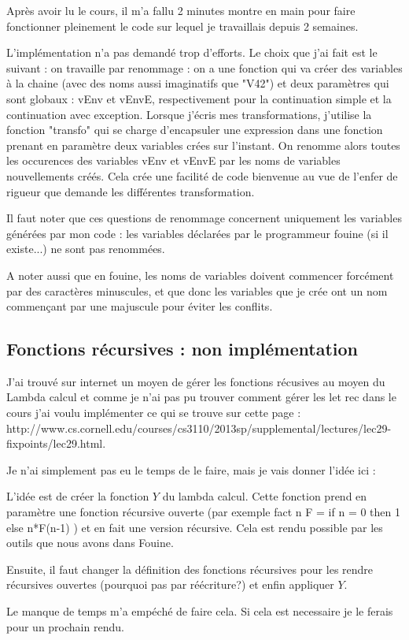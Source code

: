\documentclass[a4paper,10pt]{report}
\begin{document}
Après avoir lu le cours, il m'a fallu 2 minutes montre en main pour faire fonctionner pleinement le code sur lequel je travaillais depuis 2 semaines.

L'implémentation n'a pas demandé trop d'efforts. Le choix que j'ai fait est le suivant : on travaille par renommage : on a une fonction qui va créer des variables à la chaine (avec des noms aussi imaginatifs que "V42") et deux paramètres qui sont globaux : vEnv et vEnvE, respectivement pour la continuation simple et la continuation avec exception. Lorsque j'écris mes transformations, j'utilise la fonction "transfo" qui se charge d'encapsuler une expression dans une fonction prenant en paramètre deux variables crées sur l'instant. On renomme alors toutes les occurences des variables vEnv et vEnvE par les noms de variables nouvellements créés. Cela crée une facilité de code bienvenue au vue de l'enfer de rigueur que demande les différentes transformation.

Il faut noter que ces questions de renommage concernent uniquement les variables générées par mon code : les variables déclarées par le programmeur fouine (si il existe...) ne sont pas renommées.

A noter aussi que en fouine, les noms de variables doivent commencer forcément par des caractères minuscules, et que donc les variables que je crée ont un nom commençant par une majuscule pour éviter les conflits.

\subsection{Fonctions récursives : non implémentation}
J'ai trouvé sur internet un moyen de gérer les fonctions récusives au moyen du Lambda calcul et comme je n'ai pas pu trouver comment gérer les let rec dans le cours j'ai voulu implémenter ce qui se trouve sur cette page : http://www.cs.cornell.edu/courses/cs3110/2013sp/supplemental/lectures/lec29-fixpoints/lec29.html.

Je n'ai simplement pas eu le temps de le faire, mais je vais donner l'idée ici :

L'idée est de créer la fonction $Y$ du lambda calcul. Cette fonction prend en paramètre une fonction récursive ouverte (par exemple fact n F = if n = 0 then 1 else n*F(n-1) ) et en fait une version récursive. Cela est rendu possible par les outils que nous avons dans Fouine.

Ensuite, il faut changer la définition des fonctions récursives pour les rendre récursives ouvertes (pourquoi pas par réécriture?) et enfin appliquer $Y$.

Le manque de temps m'a empéché de faire cela. Si cela est necessaire je le ferais pour un prochain rendu.
\end{document}
